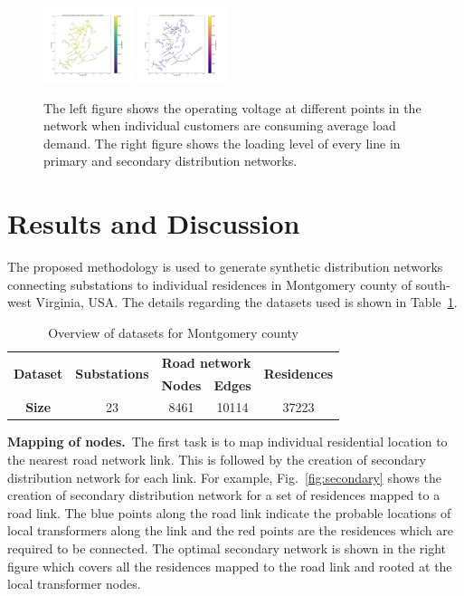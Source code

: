 \documentclass[sigconf]{acmart}
\begin{document}
\begin{figure}[htb]
	\centering
	\includegraphics[width=0.235\textwidth]{figs/24664-voltagetest.png}
	\includegraphics[width=0.235\textwidth]{figs/24664-flowtest.png}
	\caption{The left figure shows the operating voltage at different points in the network when individual customers are consuming average load demand. The right figure shows the loading level of every line in primary and secondary distribution networks.}
	\label{fig:operation-comp}
\end{figure}

\section{Results and Discussion}\label{sec:results}
The proposed methodology is used to generate synthetic distribution networks connecting substations to individual residences in Montgomery county of south-west Virginia, USA. The details regarding the datasets used is shown in Table~\ref{tab:dataset}. 
\begin{table}[htb]
	\centering
	\caption{Overview of datasets for Montgomery county}
	\label{tab:dataset}
	\begin{footnotesize}
		\begin{tabular}{ccccc}
			\hline
			\multirow{2}{*}{\textbf{Dataset}} & \multirow{2}{*}{\textbf{Substations}} & \multicolumn{2}{c}{\textbf{Road network}} & \multirow{2}{*}{\textbf{Residences}} \\ \cline{3-4}
			&  & \textbf{Nodes} & \textbf{Edges} &  \\ \hline
			\textbf{Size} & 23 & 8461 & 10114 & 37223 \\ \hline
		\end{tabular}
	\end{footnotesize}
\end{table}

\noindent \textbf{Mapping of nodes.}~The first task is to map individual residential location to the nearest road network link. This is followed by the creation of secondary distribution network for each link. For example, Fig.~\ref{fig:secondary} shows the creation of secondary distribution network for a set of residences mapped to a road link. The blue points along the road link indicate the probable locations of local transformers along the link and the red points are the residences which are required to be connected. The optimal secondary network is shown in the right figure which covers all the residences mapped to the road link and rooted at the local transformer nodes.
\end{document}
